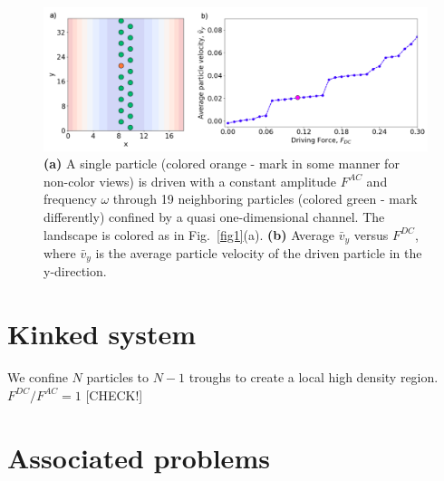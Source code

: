 \documentclass[twocolumn,preprintnumbers,amsmath,amssymb,aps,prx]{revtex4}
\begin{document}
\begin{center}
\begin{figure}[h!]
\centering
\includegraphics[width=\columnwidth]{twenty}
\caption{\textbf{(a)} A single particle (colored orange - mark in some manner for non-color views) is driven with a constant amplitude $F^{AC}$ and frequency $\omega$ through 19 neighboring particles (colored green - mark differently) confined by a quasi one-dimensional channel. The landscape is colored as in Fig.~\ref{fig1}(a). \textbf{(b)} Average $\bar{v}_{y}$ versus $F^{DC}$, where $\bar{v}_{y}$ is the average particle velocity of the driven particle in the y-direction.}
\label{fig:2}
\end{figure}
\end{center}

\section{Kinked system}
\label{sec:kink}	%
We confine $N$ particles to $N-1$ troughs to create a
local high density region.
$F^{DC}/F^{AC} = 1$ [CHECK!]





\section{Associated problems}
\label{sec:problems}	%
\end{document}
